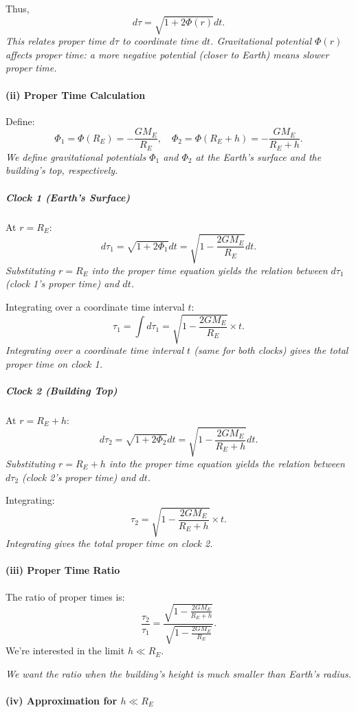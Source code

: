Thus,
\[
d\tau = \sqrt{1 + 2\Phi(r)} dt.
\]
\textit{This relates proper time $d\tau$ to coordinate time $dt$. Gravitational potential $\Phi(r)$ affects proper time: a more negative potential (closer to Earth) means slower proper time.}

\paragraph{(ii) Proper Time Calculation}

Define:
\[
\Phi_1 = \Phi(R_E) = -\frac{GM_E}{R_E}, \quad \Phi_2 = \Phi(R_E + h) = -\frac{GM_E}{R_E + h}.
\]
\textit{We define gravitational potentials $\Phi_1$ and $\Phi_2$ at the Earth's surface and the building's top, respectively.}

\subparagraph{Clock 1 (Earth's Surface)}

At $r = R_E$:
\[
d\tau_1 = \sqrt{1 + 2\Phi_1} dt = \sqrt{1 - \frac{2GM_E}{R_E}} dt.
\]
\textit{Substituting $r = R_E$ into the proper time equation yields the relation between $d\tau_1$ (clock 1's proper time) and $dt$.}

Integrating over a coordinate time interval $t$:
\[
\tau_1 = \int d\tau_1 = \sqrt{1 - \frac{2GM_E}{R_E}} \times t.
\]
\textit{Integrating over a coordinate time interval $t$ (same for both clocks) gives the total proper time on clock 1.}

\subparagraph{Clock 2 (Building Top)}

At $r = R_E + h$:
\[
d\tau_2 = \sqrt{1 + 2\Phi_2} dt = \sqrt{1 - \frac{2GM_E}{R_E + h}} dt.
\]
\textit{Substituting $r = R_E + h$ into the proper time equation yields the relation between $d\tau_2$ (clock 2's proper time) and $dt$.}

Integrating:
\[
\tau_2 = \sqrt{1 - \frac{2GM_E}{R_E + h}} \times t.
\]
\textit{Integrating gives the total proper time on clock 2.}

\paragraph{(iii) Proper Time Ratio}

The ratio of proper times is:
\[
\frac{\tau_2}{\tau_1} = \frac{\sqrt{1 - \frac{2GM_E}{R_E + h}}}{\sqrt{1 - \frac{2GM_E}{R_E}}}.
\]
We're interested in the limit $h \ll R_E$.

\textit{We want the ratio when the building's height is much smaller than Earth's radius.}

\paragraph{(iv) Approximation for \(h \ll R_E\)}

